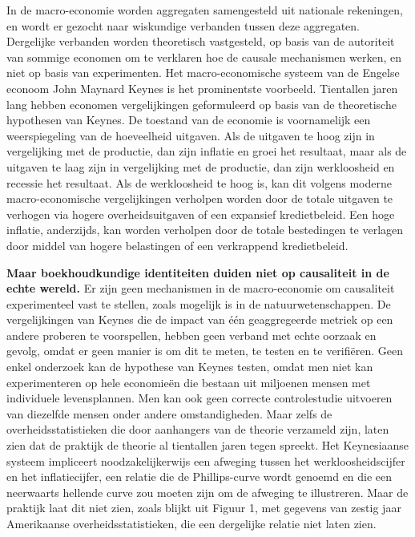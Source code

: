 In de macro-economie worden aggregaten samengesteld uit nationale rekeningen, en wordt er gezocht naar wiskundige verbanden tussen deze aggregaten. Dergelijke verbanden worden theoretisch vastgesteld, op basis van de autoriteit van sommige economen om te verklaren hoe de causale mechanismen werken, en niet op basis van experimenten. Het macro-economische systeem van de Engelse econoom John Maynard Keynes is het prominentste voorbeeld. Tientallen jaren lang hebben economen vergelijkingen geformuleerd op basis van de theoretische hypothesen van Keynes. De toestand van de economie is voornamelijk een weerspiegeling van de hoeveelheid uitgaven. Als de uitgaven te hoog zijn in vergelijking met de productie, dan zijn inflatie en groei het resultaat, maar als de uitgaven te laag zijn in vergelijking met de productie, dan zijn werkloosheid en recessie het resultaat. Als de werkloosheid te hoog is, kan dit volgens moderne macro-economische vergelijkingen verholpen worden door de totale uitgaven te verhogen via hogere overheidsuitgaven of een expansief kredietbeleid. Een hoge inflatie, anderzijds, kan worden verholpen door de totale bestedingen te verlagen door middel van hogere belastingen of een verkrappend kredietbeleid.

\textbf{Maar boekhoudkundige identiteiten duiden niet op causaliteit in de echte wereld.} Er zijn geen mechanismen in de macro-economie om causaliteit experimenteel vast te stellen, zoals mogelijk is in de natuurwetenschappen. De vergelijkingen van Keynes die de impact van één geaggregeerde metriek op een andere proberen te voorspellen, hebben geen verband met echte oorzaak en gevolg, omdat er geen manier is om dit te meten, te testen en te verifiëren. Geen enkel onderzoek kan de hypothese van Keynes testen, omdat men niet kan experimenteren op hele economieën die bestaan uit miljoenen mensen met individuele levensplannen. Men kan ook geen correcte controlestudie uitvoeren van diezelfde mensen onder andere omstandigheden. Maar zelfs de overheidsstatistieken die door aanhangers van de theorie verzameld zijn, laten zien dat de praktijk de theorie al tientallen jaren tegen spreekt. Het Keynesiaanse systeem impliceert noodzakelijkerwijs een afweging tussen het werkloosheidscijfer en het inflatiecijfer, een relatie die de Phillips-curve wordt genoemd en die een neerwaarts hellende curve zou moeten zijn om de afweging te illustreren. Maar de praktijk laat dit niet zien, zoals blijkt uit Figuur 1, met gegevens van zestig jaar Amerikaanse overheidsstatistieken, die een dergelijke relatie niet laten zien.

